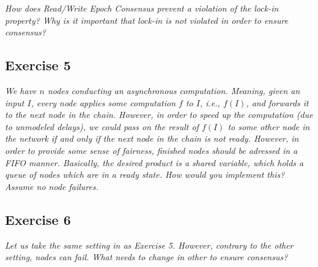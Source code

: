 \emph{How does Read/Write Epoch Consensus prevent a violation of the lock-in property? Why is it important that lock-in is not violated in order to ensure consensus?}

\subsection*{Exercise 5}
\label{sec:exercise_5}

\emph{We have $n$ nodes conducting an asynchronous computation. Meaning, given an input $I$, every node applies some computation $f$ to $I$, i.e., $f(I)$, and forwards it to the next node in the chain. However, in order to speed up the computation (due to unmodeled delays), we could pass on the result of $f(I)$ to some other node in the network if and only if the next node in the chain is not ready. However, in order to provide some sense of fairness, finished nodes should be adressed in a FIFO manner. Basically, the desired product is a shared variable, which holds a queue of nodes which are in a ready state. How would you implement this? Assume no node failures.}

\subsection*{Exercise 6}
\label{sec:exercise_6}

\emph{Let us take the same setting in as Exercise 5. However, contrary to the other setting, nodes can fail. What needs to change in other to ensure consensus?}


